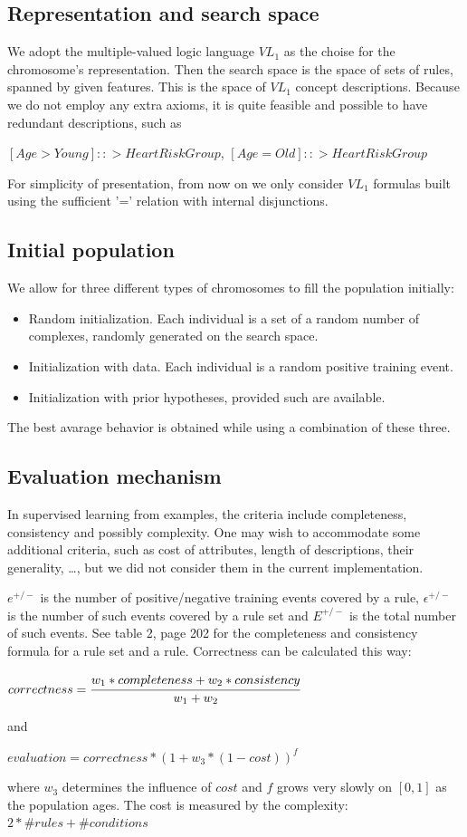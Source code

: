\documentclass[12pt]{book}
\begin{document}
\subsection{Representation and search space}
We adopt the multiple-valued logic language $VL_1$ as the choise for the chromosome's representation. Then the search space is the space of sets of rules, spanned by given features. This is the space of $VL_1$ concept descriptions. Because we do not employ any extra axioms, it is quite feasible and possible to have redundant descriptions, such as
\begin{center}
$[Age > Young] ::> HeartRiskGroup$, $[Age = Old] ::> HeartRiskGroup$
\end{center}
For simplicity of presentation, from now on we only consider $VL_1$ formulas built using the sufficient '=' relation with internal disjunctions.

\subsection{Initial population}
We allow for three different types of chromosomes to fill the population initially:
\begin{itemize}
\item Random initialization. Each individual is a set of a random number of complexes, randomly generated on the search space.
\item Initialization with data. Each individual is a random positive training event.
\item Initialization with prior hypotheses, provided such are available.
\end{itemize}
The best avarage behavior is obtained while using a combination of these three.

\subsection{Evaluation mechanism}
\label{sec:evaluation}
In supervised learning from examples, the criteria include completeness, consistency and possibly complexity. One may wish to accommodate some additional criteria, such as cost of attributes, length of descriptions, their generality, \dots, but we did not consider them in the current implementation.

$e^{+/-}$ is the number of positive/negative training events covered by a rule, $\epsilon^{+/-}$ is the number of such events covered by a rule set and $E^{+/-}$ is the total number of such events. See table 2, page 202 for the completeness and consistency formula for a rule set and a rule. Correctness can be calculated this way:
\begin{center}
$correctness = \cfrac{w_1*completeness + w_2*consistency}{w_1 + w_2}$
\end{center}
and
\begin{center}
$evaluation = correctness*(1 + w_3*(1 - cost))^f$
\end{center}
where $w_3$ determines the influence of $cost$ and $f$ grows very slowly on $[0,1]$ as the population ages. The cost is measured by the complexity: $2*\#rules+\#conditions$
\end{document}
